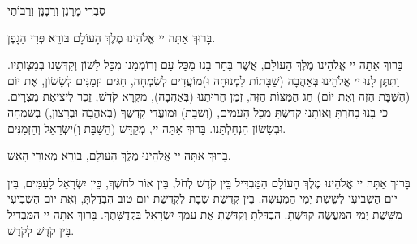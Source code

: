 

\begin{framed}

\end{framed}

\begin{center}
סַבְרִי מָרָנָן וְרַבָּנָן וְרַבּוֹתַי

בָּרוּךְ אַתָּה יי אֱלֹהֵינוּ מֶלֶךְ הָעוֹלָם בּוֹרֵא פְּרִי הַגָפֶן.
\end{center}


בָּרוּךְ אַתָּה יי אֱלֹהֵינוּ מֶלֶךְ הָעוֹלָם, אֲשֶׁר בָּחַר בָּנוּ מִכָּל עָם וְרוֹמְמָנוּ מִכָּל לָשׁוֹן וְקִדְּשָׁנוּ בְּמִצְוֹתָיו. וַתִּתֶּן לָנוּ יי אֱלֹהֵינוּ בְּאַהֲבָה (שַׁבָּתוֹת לִמְנוּחָה וּ)מוֹעֲדִים לְשִׂמְחָה, חַגִּים וּזְמַנִּים לְשָׂשׂוֹן, אֶת יוֹם (הַשַּׁבָּת הַזֶה וְאֶת יוֹם) חַג הַמַּצּוֹת הַזֶּה, זְמַן חֵרוּתֵנוּ (בְּאַהֲבָה), מִקְרָא קֹדֶשׁ, זֵכֶר לִיצִיאַת מִצְרָיִם. כִּי בָנוּ בָחַרְתָּ וְאוֹתָנוּ קִדַּשְׁתָּ מִכָּל הָעַמִּים, (וְשַׁבָּת) וּמוֹעֲדֵי קָדְשֶךָ (בְּאַהֲבָה וּבְרָצוֹן,) בְּשִׂמְחָה וּבְשָׂשׂוֹן הִנְחַלְתָּנוּ. בָּרוּךְ אַתָּה יי, מְקַדֵּשׁ (הַשַּׁבָּת וְ)יִשְׂרָאֵל וְהַזְּמַנִּים.

\begin{framed}

בָּרוּךְ אַתָּה יי אֱלֹהֵינוּ מֶלֶךְ הָעוֹלָם, בּוֹרֵא מְאוֹרֵי הָאֵשׁ.

בָּרוּךְ אַתָּה יי אֱלֹהֵינוּ מֶלֶךְ הָעוֹלָם הַמַּבְדִּיל בֵּין קֹדֶשׁ לְחֹל, בֵּין אוֹר לְחשֶׁךְ, בֵּין יִשְׂרָאֵל לָעַמִּים, בֵּין יוֹם הַשְּׁבִיעִי לְשֵׁשֶׁת יְמֵי הַמַּעֲשֶׂה. בֵּין קְדֻשַּׁת שַׁבָּת לִקְדֻשַּׁת יוֹם טוֹב הִבְדַּלְתָּ, וְאֶת יוֹם הַשְּׁבִיעִי מִשֵּׁשֶׁת יְמֵי הַמַּעֲשֶׂה קִדַּשְׁתָּ. הִבְדַּלְתָּ וְקִדַּשְׁתָּ אֶת עַמְּךָ יִשְׂרָאֵל בִּקְדֻשָּׁתֶךָ. בָּרוּךְ אַתָּה יי הַמַּבְדִיל בֵּין קֹדֶשׁ לְקֹדֶשׁ.
\end{framed}


